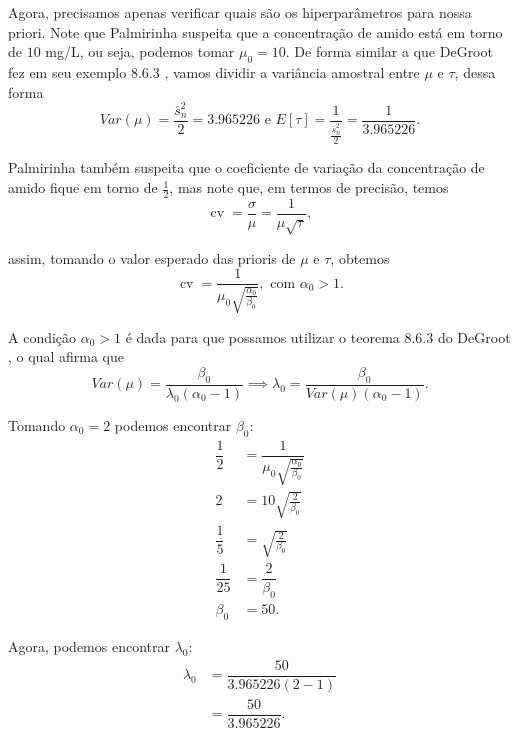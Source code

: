 \documentclass{article}
\begin{document}
Agora, precisamos apenas verificar quais são os hiperparâmetros para nossa priori. Note que Palmirinha suspeita que a concentração de amido está em torno de $10$ mg/L, ou seja, podemos tomar $\mu_0 = 10$. De forma similar a que DeGroot fez em seu exemplo 8.6.3 \cite{degroot}, vamos dividir a variância amostral entre $\mu$ e $\tau$, dessa forma
\[Var(\mu) = \dfrac{\overline{s}_n^2}{2} = 3.965226 \text{ e } E[\tau] = \dfrac{1}{\frac{\overline{s}_n^2}{2}} = \dfrac{1}{3.965226}.\]

Palmirinha também suspeita que o coeficiente de variação da concentração de amido fique em torno de $\frac{1}{2}$, mas note que, em termos de precisão, temos
\[\operatorname{cv} = \dfrac{\sigma}{\mu} = \dfrac{1}{\mu \sqrt{\tau}},\]

\noindent assim, tomando o valor esperado das prioris de $\mu$ e $\tau$, obtemos
\[\operatorname{cv} = \dfrac{1}{\mu_0 \sqrt{\frac{\alpha_0}{\beta_0}}}, \text{ com } \alpha_0 > 1.\]

A condição $\alpha_0 > 1$ é dada para que possamos utilizar o teorema 8.6.3 do DeGroot \cite{degroot}, o qual afirma que
\[Var(\mu) = \dfrac{\beta_0}{\lambda_0 \left(\alpha_0 - 1\right)} \implies \lambda_0 = \dfrac{\beta_0}{Var(\mu) \left(\alpha_0 - 1\right)}.\]

Tomando $\alpha_0 = 2$ podemos encontrar $\beta_0$:
\begin{equation*}
    \begin{split}
        \dfrac{1}{2} & = \dfrac{1}{\mu_0 \sqrt{\frac{\alpha_0}{\beta_0}}} \\
        2 & = 10 \sqrt{\frac{2}{\beta_0}} \\
        \dfrac{1}{5} & = \sqrt{\frac{2}{\beta_0}} \\
        \dfrac{1}{25} & = \dfrac{2}{\beta_0} \\
        \beta_0 & = 50.
    \end{split}
\end{equation*}

Agora, podemos encontrar $\lambda_0$:
\begin{equation*}
    \begin{split}
        \lambda_0 & = \dfrac{50}{3.965226 \left(2 - 1\right)} \\
        & = \dfrac{50}{3.965226}.
    \end{split}
\end{equation*}
\end{document}
